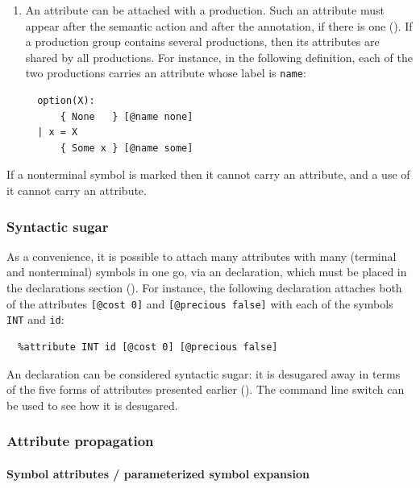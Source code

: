 \documentclass[onecolumn,11pt,nocopyrightspace,preprint]{sigplanconf}
\begin{document}
\begin{enumerate}
\item An attribute can be attached with a production.
  Such an attribute must appear after the semantic action
  and after the \dprec annotation, if there is one
  ().
  If a production group contains several productions,
  then its attributes are shared by all productions.
  For instance, in the following definition,
  each of the two productions carries an attribute
  whose label is \texttt{name}:
\begin{verbatim}
  option(X):
      { None   } [@name none]
  | x = X
      { Some x } [@name some]
\end{verbatim}

\end{enumerate}

If a nonterminal symbol is marked \dinline then it cannot carry an attribute,
and a use of it cannot carry an attribute.

\subsubsection{Syntactic sugar}


As a convenience, it is possible to attach many attributes with many (terminal
and nonterminal) symbols in one go, via an \dattribute declaration, which must
be placed in the declarations section ().
For instance, the following declaration attaches both of the attributes
\verb+[@cost 0]+ and \verb+[@precious false]+
with each of the symbols
\verb+INT+ and \verb+id+:
\begin{verbatim}
  %attribute INT id [@cost 0] [@precious false]
\end{verbatim}
An \dattribute declaration can be considered syntactic sugar: it is desugared
away in terms of the five forms of attributes presented earlier
().
The command line switch \oonlypreprocess can be used to see how it is desugared.

\subsubsection{Attribute propagation}

\paragraph{Symbol attributes / parameterized symbol expansion}
\end{document}
